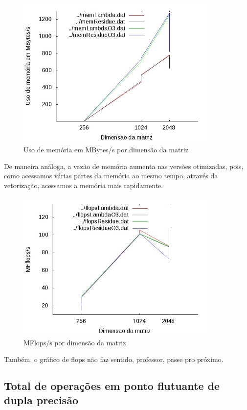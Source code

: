 \documentclass[12pt]{article}
\begin{document}
\begin{figure}[htb] \begin{center}
\includegraphics[width=100mm]{img/memUse.jpg} \end{center}
\caption{Uso de memória em MBytes/s por dimensão da matriz}\label{fig:usoMem}
\end{figure}

De maneira análoga, a vazão de memória aumenta nas versões otimizadas, pois, 
como acessamos várias partes da memória ao mesmo tempo, através da vetorização, 
acessamos a memória mais rapidamente.

\begin{figure}[htb] \begin{center}
\includegraphics[width=100mm]{img/flops.jpg} \end{center}
\caption{MFlops/s por dimensão da matriz}\label{fig:flops}
\end{figure}

Também, o gráfico de flops não faz sentido, professor, passe pro próximo.

\subsection{Total de operações em ponto flutuante de dupla precisão}\label{sec:flopOp}
\end{document}
